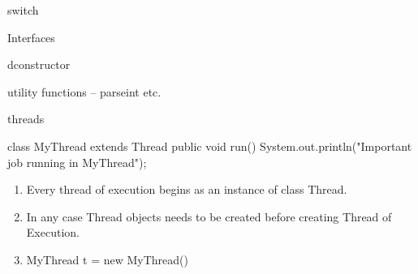 \documentclass[11pt]{beamer}
\begin{document}
\begin{frame}{switch}

\end{frame}


\begin{frame}{Interfaces}

\end{frame}


\begin{frame}{dconstructor}

\end{frame}



\begin{frame}{utility functions -- parseint etc.}

\end{frame}



\begin{frame}{threads}

\begin{java}
class MyThread extends Thread
{
public void run()
{
System.out.println("Important job running in MyThread");
}
}

\end{java}

\begin{enumerate}
\item Every thread of execution begins as an instance of class Thread.
\item  In any case Thread objects needs to be created before creating Thread of Execution.
\item MyThread t = new MyThread()



\end{enumerate}
\end{frame}
\end{document}
